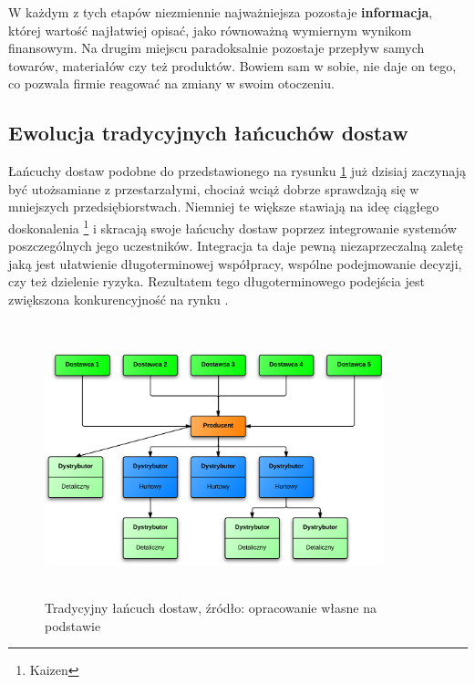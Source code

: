 	W każdym z tych etapów niezmiennie najważniejsza 
	pozostaje \textbf{informacja}, której wartość najłatwiej
	opisać, jako równoważną wymiernym wynikom finansowym. 
	Na drugim miejscu paradoksalnie pozostaje przepływ
	samych towarów, materiałów czy też produktów. 
	Bowiem sam w sobie, nie daje on tego, co pozwala
	firmie reagować na zmiany w swoim otoczeniu.
	
	\subsection{Ewolucja tradycyjnych łańcuchów dostaw}
		\hspace{15pt}Łańcuchy dostaw podobne do przedstawionego na rysunku \ref{fig:simple_supply_chain} już dzisiaj 
		zaczynają być utożsamiane z przestarzałymi, chociaż
		wciąż dobrze sprawdzają się w mniejszych przedsiębiorstwach. 
		Niemniej te większe stawiają na ideę ciągłego doskonalenia
		\footnote{Kaizen} i skracają swoje łańcuchy dostaw poprzez integrowanie 
		systemów poszczególnych jego uczestników.
		Integracja ta daje pewną niezaprzeczalną zaletę jaką jest ułatwienie 
		długoterminowej współpracy, wspólne podejmowanie decyzji, czy też
		dzielenie ryzyka. Rezultatem tego długoterminowego
		podejścia jest zwiększona konkurencyjność na rynku \cite{zarzadzanie_lancuchem_dostaw_w_dobie_gospodarki_elektroniczej}.\\
		
		\begin{figure}[h]
			\centering
			\includegraphics[width=370px, height=300px]{images/BasicSupplyChain}
			\caption[Schemat budowy prostego łańcucha dostaw]{Tradycyjny łańcuch dostaw, źródło: opracowanie własne na podstawie \cite{zarzadzanie_lancuchem_dostaw_w_dobie_gospodarki_elektroniczej}}
			\label{fig:simple_supply_chain}
		\end{figure}		
		
